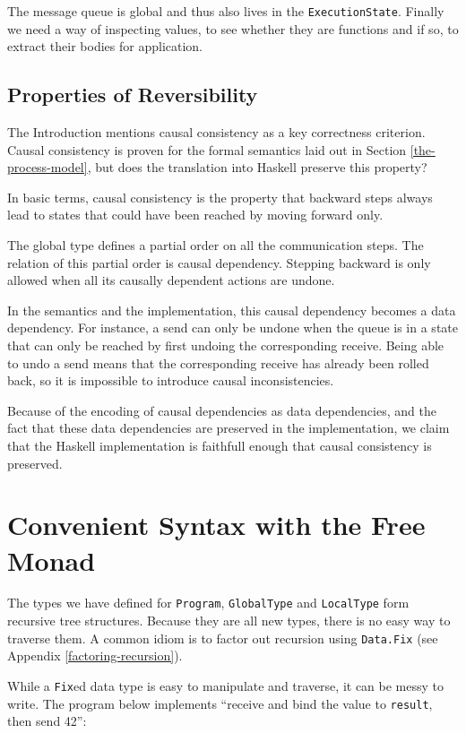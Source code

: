 \documentclass[runningheads,plain]{llncs}
\begin{document}
The message queue is global and thus also lives in the
\texttt{ExecutionState}. Finally we need a way of inspecting values, to
see whether they are functions and if so, to extract their bodies for
application.

\subsection{Properties of Reversibility}\label{properties-of-reversibility}

The Introduction mentions causal consistency as a key correctness criterion. 
Causal consistency is proven for the formal semantics laid out in Section \ref{the-process-model}, 
but does the translation into Haskell preserve this property? 

In basic terms, causal consistency is the property that backward steps always lead to states that 
could have been reached by moving forward only.

The global type defines a partial order on all the communication steps.
The relation of this partial order is causal dependency. Stepping
backward is only allowed when all its causally dependent actions are
undone. 

In the semantics and the implementation, this causal dependency becomes a data dependency. 
For instance, a send can only be undone when the queue is in a state that can only be reached by first undoing the corresponding receive.
Being able to undo a send means that the corresponding receive has already been rolled back, so it is impossible to introduce causal inconsistencies. 

Because of the encoding of causal dependencies as data dependencies, and the fact that these data dependencies are preserved in the implementation,  
we claim that the Haskell implementation is faithfull enough that causal consistency is preserved.


\section{Convenient Syntax with the Free Monad}\label{free-monad-dsl}

The types we have defined for \texttt{Program}, \texttt{GlobalType} and
\texttt{LocalType} form recursive tree structures. Because they are all
new types, there is no easy way to traverse them. A common idiom is to
factor out recursion using \texttt{Data.Fix} (see Appendix
\ref{factoring-recursion}).

While a \texttt{Fix}ed data type is easy to manipulate and traverse, it
can be messy to write. The program below implements ``receive and bind
the value to \texttt{result}, then send 42'':
\end{document}

